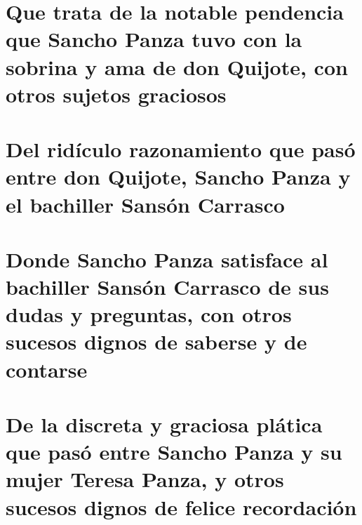 \documentclass[letterpaper,12pt]{book}
\begin{document}
\chapter[Que trata de la notable pendencia ...]{Que trata de la notable pendencia que Sancho Panza tuvo con la sobrina y ama de don Quijote, con otros sujetos graciosos}


\chapter[Del ridículo razonamiento ...]{Del ridículo razonamiento que pasó entre don Quijote, Sancho Panza y el bachiller Sansón Carrasco}


\chapter[Donde Sancho Panza satisface al ...]{Donde Sancho Panza satisface al bachiller Sansón Carrasco de sus dudas y preguntas, con otros sucesos dignos de saberse y de contarse}


\chapter[De la discreta y graciosa plática ...]{De la discreta y graciosa plática que pasó entre Sancho Panza y su mujer Teresa Panza, y otros sucesos dignos de felice recordación }

\end{document}
